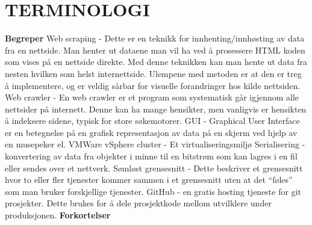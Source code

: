 \documentclass[../main.tex]{subfiles}
\begin{document}
\section*{TERMINOLOGI}

{\bfseries \large Begreper}\newline
\newline
Web scraping - Dette er en teknikk for innhenting/innhøsting av data fra en nettside. Man henter ut dataene man vil ha ved å prosessere HTML koden som vises på en nettside direkte. Med denne teknikken kan man hente ut data fra nesten hvilken som helst internettside. Ulempene med metoden er at den er treg å implementere, og er veldig sårbar for visuelle forandringer hos kilde nettsiden.\newline
\newline
Web crawler - En web crawler er et program som systematisk går igjennom alle nettsider på internett. Denne kan ha mange hensikter, men vanligvis er hensikten å indeksere sidene, typisk for store søkemotorer.\newline
\newline
GUI - Graphical User Interface er en betegnelse på en grafisk representasjon av data på en skjerm ved hjelp av en musepeker el.\newline
\newline
VMWare vSphere cluster - Et virtualiseringsmiljø \newline
\newline
Serialisering - konvertering av data fra objekter i minne til en bitstrøm som kan lagres i en fil eller sendes over et nettverk.\newline
\newline
Sømløst grensesnitt - Dette beskriver et grensesnitt hvor to eller fler tjenester kommer sammen i et grensesnitt uten at det “føles” som man bruker forskjellige tjenester.\newline
\newline
GitHub - en gratis hosting tjeneste for git prosjekter. Dette brukes for å dele prosjektkode mellom utvilklere under produksjonen.\newline
\newline
{\bfseries \large Forkortelser}\newline
\end{document}
